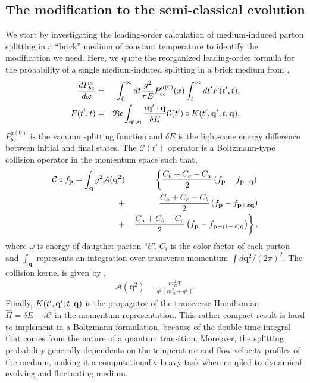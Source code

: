\documentclass[aps, prc, reprint, amsmath, groupedaddress, nofootinbib]{revtex4-1}
\begin{document}
\subsection{The modification to the semi-classical evolution}
We start by investigating the leading-order calculation of medium-induced parton splitting in a ``brick'' medium of constant temperature to identify the modification we need.
Here, we quote the reorganized leading-order formula for the probability of a single medium-induced splitting in a brick medium from \cite{Zakharov:1996fv,CaronHuot:2010bp},
\begin{eqnarray}
\frac{dP^{a}_{bc}}{d\omega} &=& \int_0^\infty dt \frac{g^2}{\pi E} P_{bc}^{a(0)}(x) \int_t^\infty dt'  F(t', t),
\label{eq:full-theory}
\\
F(t', t) &=& \mathfrak{Re} \int_{{\bf q}', {\bf q}} \frac{i {\bf q}'\cdot {\bf q}}{\delta E} \mathcal{C}(t') \circ K(t', {\bf q}'; t, {\bf q}).
\end{eqnarray}
$P_{bc}^{a(0)}$ is the vacuum splitting function and $\delta E$ is the light-cone energy difference between initial and final states. 
The $\mathcal{C}(t')$ operator is a Boltzmann-type collision operator in the momentum space such that,
\begin{eqnarray}
\mathcal{C}\circ f_{\mathbf{p}} = \int_{\bf q} g^2\mathcal{A}(\mathbf{q}^2)
&&\left\{  \frac{C_b+C_c-C_a}{2}\left(f_{\bf p}-f_{{\bf p}-{\bf q}}\right) \right.\\\nonumber
 +&&    \frac{C_a+C_c-C_b}{2}\left(f_{\bf p}-f_{{\bf p}+x{\bf q}}\right) \\\nonumber
+&&  \left. \frac{C_a+C_b-C_c}{2}\left(f_{\bf p}-f_{{\bf p}+(1-x){\bf q}}\right)\right\},
\end{eqnarray}
where $\omega$ is energy of daugther parton ``$b$''.
$C_i$ is the color factor of each parton and $\int_{\mathbf{q}}$ represents an integration over transverse momentum $\int d\mathbf{q}^2/(2\pi)^2$.
The collision kernel is given by \cite{Aurenche:2002pd},
\begin{eqnarray}
\mathcal{A}(\mathbf{q}^2) = \frac{m_D^2 T}{q^2\left(m_D^2+q^2\right)}.
\label{eq:kernel}
\end{eqnarray}
Finally, $K(t', {\bf q}'; t, {\bf q})$ is the propagator of the transverse  Hamiltonian $\hat{H} = \delta E - i\mathcal{C}$ in the momentum representation.
This rather compact result is hard to implement in a Boltzmann formulation, because of the double-time integral that comes from the nature of a quantum transition.
Moreover, the splitting probability generally dependents on the temperature and flow velocity profiles of the medium, making it a computationally heavy task when coupled to dynamical evolving and fluctuating medium.
\end{document}
